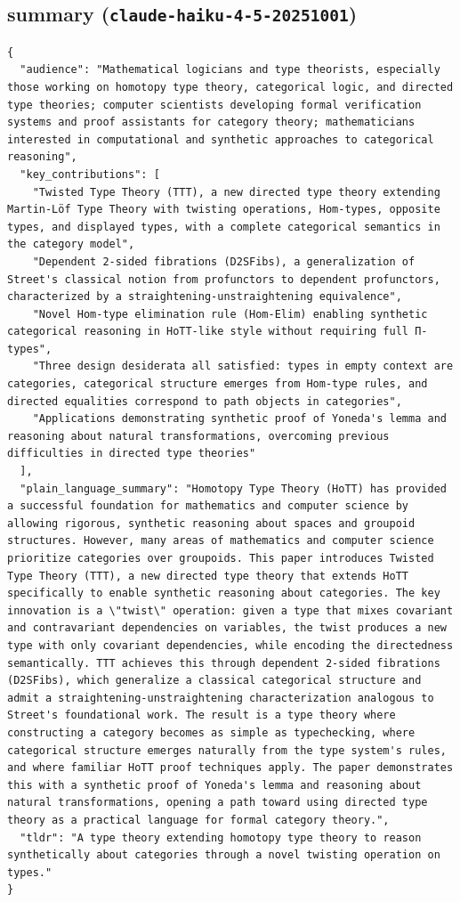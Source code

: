 \documentclass[11pt]{article}
\begin{document}
\subsection*{summary (\texttt{claude-haiku-4-5-20251001})}
\begin{verbatim}
{
  "audience": "Mathematical logicians and type theorists, especially those working on homotopy type theory, categorical logic, and directed type theories; computer scientists developing formal verification systems and proof assistants for category theory; mathematicians interested in computational and synthetic approaches to categorical reasoning",
  "key_contributions": [
    "Twisted Type Theory (TTT), a new directed type theory extending Martin-Löf Type Theory with twisting operations, Hom-types, opposite types, and displayed types, with a complete categorical semantics in the category model",
    "Dependent 2-sided fibrations (D2SFibs), a generalization of Street's classical notion from profunctors to dependent profunctors, characterized by a straightening-unstraightening equivalence",
    "Novel Hom-type elimination rule (Hom-Elim) enabling synthetic categorical reasoning in HoTT-like style without requiring full Π-types",
    "Three design desiderata all satisfied: types in empty context are categories, categorical structure emerges from Hom-type rules, and directed equalities correspond to path objects in categories",
    "Applications demonstrating synthetic proof of Yoneda's lemma and reasoning about natural transformations, overcoming previous difficulties in directed type theories"
  ],
  "plain_language_summary": "Homotopy Type Theory (HoTT) has provided a successful foundation for mathematics and computer science by allowing rigorous, synthetic reasoning about spaces and groupoid structures. However, many areas of mathematics and computer science prioritize categories over groupoids. This paper introduces Twisted Type Theory (TTT), a new directed type theory that extends HoTT specifically to enable synthetic reasoning about categories. The key innovation is a \"twist\" operation: given a type that mixes covariant and contravariant dependencies on variables, the twist produces a new type with only covariant dependencies, while encoding the directedness semantically. TTT achieves this through dependent 2-sided fibrations (D2SFibs), which generalize a classical categorical structure and admit a straightening-unstraightening characterization analogous to Street's foundational work. The result is a type theory where constructing a category becomes as simple as typechecking, where categorical structure emerges naturally from the type system's rules, and where familiar HoTT proof techniques apply. The paper demonstrates this with a synthetic proof of Yoneda's lemma and reasoning about natural transformations, opening a path toward using directed type theory as a practical language for formal category theory.",
  "tldr": "A type theory extending homotopy type theory to reason synthetically about categories through a novel twisting operation on types."
}
\end{verbatim}
\end{document}
